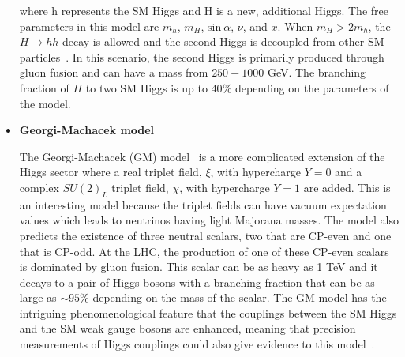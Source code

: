 \begin{itemize}[wide, labelwidth=!, labelindent=0pt]
\noindent
where h represents the SM Higgs and H is a new, additional Higgs. The free parameters in this model are $m_{h}$, $m_{H}$, $\mathrm{sin}\:\alpha$, $\nu$, and $x$. When $m_{H} > 2m_{h}$, the $H\rightarrow hh$ decay is allowed and the second Higgs is decoupled from other SM particles~\cite{HiggsSingletPheno}. In this scenario, the second Higgs is primarily produced through gluon fusion and can have a mass from $250-1000$ GeV. The branching fraction of $H$ to two SM Higgs is up to $40\%$ depending on the parameters of the model.

\item[ ]
\textbf{Georgi-Machacek model}

\indent
The Georgi-Machacek (GM) model~\cite{GMmodel} is a more complicated extension of the Higgs sector where a real triplet field, $\xi$, with hypercharge $Y=0$ and a complex $SU(2)_{L}$ triplet field, $\chi$, with hypercharge $Y=1$ are added. This is an interesting model because the triplet fields can have vacuum expectation values which leads to neutrinos having light Majorana masses. The model also predicts the existence of three neutral scalars, two that are CP-even and one that is CP-odd. At the LHC, the production of one of these CP-even scalars is dominated by gluon fusion. This scalar can be as heavy as 1 TeV and it decays to a pair of Higgs bosons with a branching fraction that can be as large as ${\sim}95\%$ depending on the mass of the scalar. The GM model has the intriguing phenomenological feature that the couplings between the SM Higgs and the SM weak gauge bosons are enhanced, meaning that precision measurements of Higgs couplings could also give evidence to this model~\cite{GMmodelPheno}.


\end{itemize}















